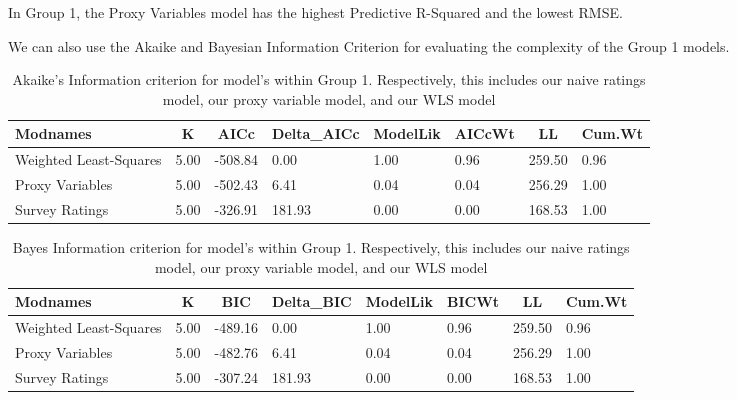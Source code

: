 \documentclass[
  man,floatsintext]{apa6}
\begin{document}
In Group 1, the Proxy Variables model has the highest Predictive R-Squared and the lowest RMSE.

We can also use the Akaike and Bayesian Information Criterion for evaluating the complexity of the Group 1 models.

\begin{table}[H]

\begin{center}
\begin{threeparttable}

\caption{\label{tab:aic-bic}Akaike's Information criterion for model's within Group 1. Respectively, this includes our naive ratings model, our proxy variable model, and our WLS model}

\begin{tabular}{llllllll}
\toprule
Modnames & \multicolumn{1}{c}{K} & \multicolumn{1}{c}{AICc} & \multicolumn{1}{c}{Delta\_AICc} & \multicolumn{1}{c}{ModelLik} & \multicolumn{1}{c}{AICcWt} & \multicolumn{1}{c}{LL} & \multicolumn{1}{c}{Cum.Wt}\\
\midrule
Weighted Least-Squares & 5.00 & -508.84 & 0.00 & 1.00 & 0.96 & 259.50 & 0.96\\
Proxy Variables & 5.00 & -502.43 & 6.41 & 0.04 & 0.04 & 256.29 & 1.00\\
Survey Ratings & 5.00 & -326.91 & 181.93 & 0.00 & 0.00 & 168.53 & 1.00\\
\bottomrule
\end{tabular}

\end{threeparttable}
\end{center}

\end{table}

\begin{table}[H]

\begin{center}
\begin{threeparttable}

\caption{\label{tab:aic-bic}Bayes Information criterion for model's within Group 1. Respectively, this includes our naive ratings model, our proxy variable model, and our WLS model}

\begin{tabular}{llllllll}
\toprule
Modnames & \multicolumn{1}{c}{K} & \multicolumn{1}{c}{BIC} & \multicolumn{1}{c}{Delta\_BIC} & \multicolumn{1}{c}{ModelLik} & \multicolumn{1}{c}{BICWt} & \multicolumn{1}{c}{LL} & \multicolumn{1}{c}{Cum.Wt}\\
\midrule
Weighted Least-Squares & 5.00 & -489.16 & 0.00 & 1.00 & 0.96 & 259.50 & 0.96\\
Proxy Variables & 5.00 & -482.76 & 6.41 & 0.04 & 0.04 & 256.29 & 1.00\\
Survey Ratings & 5.00 & -307.24 & 181.93 & 0.00 & 0.00 & 168.53 & 1.00\\
\bottomrule
\end{tabular}

\end{threeparttable}
\end{center}

\end{table}
\end{document}
